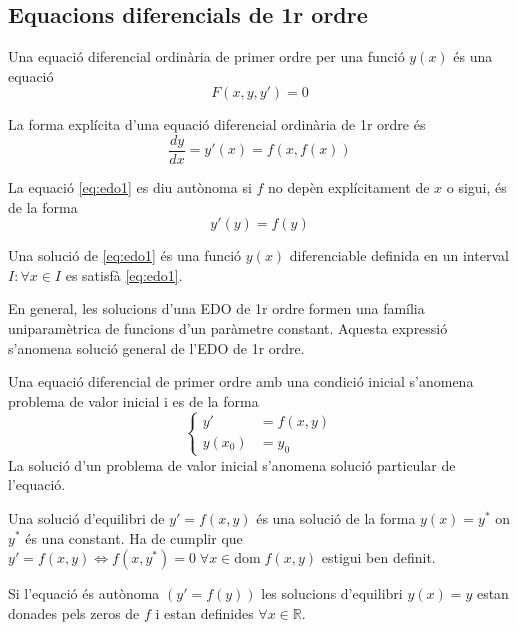 \documentclass[../main.tex]{subfiles}
\begin{document}
\subsection{Equacions diferencials de 1r ordre}
\begin{definicio}
    Una equació diferencial ordinària de primer ordre per una funció $y(x)$ és una equació
    \begin{displaymath}
        F(x,y,y') = 0
    \end{displaymath}
\end{definicio}
\begin{definicio}
    La forma explícita d'una equació diferencial ordinària de 1r ordre és
    \begin{equation}
        \frac{dy}{dx} = y'(x) = f\left(x, f\left(x\right)\right)
        \label{eq:edo1}
    \end{equation}
\end{definicio}
\begin{definicio}
    La equació \eqref{eq:edo1} es diu autònoma si $f$ no
    depèn explícitament de $x$ o sigui, és de la forma
    \begin{displaymath}
    	y'(y) = f(y)
    \end{displaymath}
\end{definicio}
\begin{definicio}
    Una solució de \eqref{eq:edo1} és una funció
    $y(x)$ diferenciable definida en un interval $I : \forall x \in I$ es satisfà \eqref{eq:edo1}.
\end{definicio}
En general, les solucions d'una EDO de 1r ordre formen una família uniparamètrica de funcions d'un
paràmetre constant. Aquesta expressió s'anomena solució general de l'EDO de 1r ordre.
\begin{definicio}
    Una equació diferencial de primer ordre amb una condició inicial s'anomena problema de valor inicial i es de la forma
    \begin{equation}
        \begin{cases}
            y' &= f(x, y)\\
            y(x_0) &= y_0
        \end{cases}
        \label{eq:edo1pvi}
    \end{equation}
    La solució d'un problema de valor inicial s'anomena solució particular de l'equació.
\end{definicio}
\begin{definicio}
	Una solució d'equilibri de $y' = f(x, y)$ és una solució de la forma $y(x) = y^*$ on $y^*$ és una constant.
	Ha de cumplir que $y' = f(x, y) \iff f(x, y^*) = 0 \;\forall x \in \text{dom}\;f(x, y)$ estigui ben definit.\\
\end{definicio}
Si l'equació és autònoma $\left(y' = f(y)\right)$ les solucions d'equilibri $y(x) = y$ estan donades pels zeros
de $f$ i estan definides $\forall x \in \mathbb{R}$.
\end{document}
